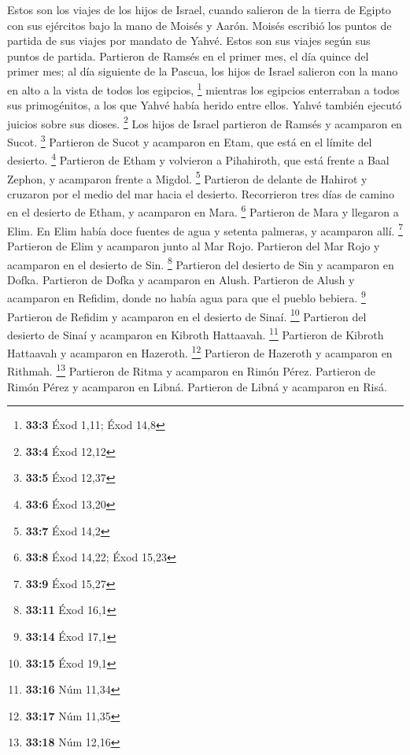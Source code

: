 \begin{paracol}{2}
 Estos son los viajes de los hijos de Israel, cuando
salieron de la tierra de Egipto con sus ejércitos bajo la mano de Moisés
y Aarón.  Moisés escribió los puntos de partida de sus
viajes por mandato de Yahvé. Estos son sus viajes según sus puntos de
partida.  Partieron de Ramsés en el primer mes, el día
quince del primer mes; al día siguiente de la Pascua, los hijos de
Israel salieron con la mano en alto a la vista de todos los egipcios,
\footnote{\textbf{33:3} Éxod 1,11; Éxod 14,8}  mientras
los egipcios enterraban a todos sus primogénitos, a los que Yahvé había
herido entre ellos. Yahvé también ejecutó juicios sobre sus dioses.
\footnote{\textbf{33:4} Éxod 12,12}  Los hijos de Israel
partieron de Ramsés y acamparon en Sucot. \footnote{\textbf{33:5} Éxod
  12,37}  Partieron de Sucot y acamparon en Etam, que está
en el límite del desierto. \footnote{\textbf{33:6} Éxod 13,20}
 Partieron de Etham y volvieron a Pihahiroth, que está
frente a Baal Zephon, y acamparon frente a Migdol. \footnote{\textbf{33:7}
  Éxod 14,2}  Partieron de delante de Hahirot y cruzaron
por el medio del mar hacia el desierto. Recorrieron tres días de camino
en el desierto de Etham, y acamparon en Mara. \footnote{\textbf{33:8}
  Éxod 14,22; Éxod 15,23}  Partieron de Mara y llegaron a
Elim. En Elim había doce fuentes de agua y setenta palmeras, y acamparon
allí. \footnote{\textbf{33:9} Éxod 15,27}  Partieron de
Elim y acamparon junto al Mar Rojo.  Partieron del Mar
Rojo y acamparon en el desierto de Sin. \footnote{\textbf{33:11} Éxod
  16,1}  Partieron del desierto de Sin y acamparon en
Dofka.  Partieron de Dofka y acamparon en Alush.
 Partieron de Alush y acamparon en Refidim, donde no
había agua para que el pueblo bebiera. \footnote{\textbf{33:14} Éxod
  17,1}  Partieron de Refidim y acamparon en el desierto
de Sinaí. \footnote{\textbf{33:15} Éxod 19,1}  Partieron
del desierto de Sinaí y acamparon en Kibroth Hattaavah. \footnote{\textbf{33:16}
  Núm 11,34}  Partieron de Kibroth Hattaavah y acamparon
en Hazeroth. \footnote{\textbf{33:17} Núm 11,35} 
Partieron de Hazeroth y acamparon en Rithmah. \footnote{\textbf{33:18}
  Núm 12,16}  Partieron de Ritma y acamparon en Rimón
Pérez.  Partieron de Rimón Pérez y acamparon en Libná.
 Partieron de Libná y acamparon en Risá. 

\end{paracol}
